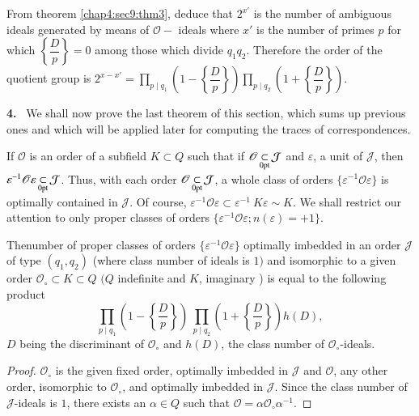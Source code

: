  From theorem \ref{chap4:sec9:thm3}, deduce that $ 2^{x'} $ is the number of ambiguous
 ideals generated by means of  $ \mathscr{O} -$ ideals where $ x' $ is
 the number of primes  $p$ for which $ \left\{ \dfrac{D}{p} \right\}
 = 0 $  among those which divide $ q_1 q_2 $. Therefore the order of
 the quotient group is  $ 2^{x-x'} = \prod \limits_{p \mid q_1}  \left( 1-
 \left\{ \dfrac{D}{p} \right\} \right)  \prod \limits_{p \mid q_2}  \left( 1
 + \left\{ \dfrac{D}{p} \right\} \right) $.  
 
\textbf{4.}~  We shall now prove the last theorem of this section, which sums
  up previous ones and which will be applied later for computing the
  traces of correspondences.  

If $ \mathscr{O} $ is an order of a subfield  $ K \subset Q $ such
that if $ \mathscr{O}  \subs\limits_{\0pt} \mathcal{J} $ and $
\varepsilon $, a unit of $ \mathcal{J} $, then $ \varepsilon^{-1}
\mathscr{O}  \varepsilon  \subs\limits_{\0pt} \mathcal{J} $. Thus,
with each order  $ \mathscr{O}  \subs\limits_{\0pt} \mathcal{J} $, a
whole class of orders  $ \big \{ \varepsilon^{-1} \mathscr{O}
\varepsilon \big \} $ is optimally contained  in  $ \mathcal{J} $. Of
course,  $\varepsilon^{-1} \mathscr{O} \varepsilon \subset
\varepsilon^{-1} ~ K \varepsilon \sim K $. We shall restrict our
attention to only proper classes of orders $ \big \{ \varepsilon^{-1}
\mathscr{O} \varepsilon ; n ( \varepsilon ) = + 1 \big \} $. 

\begin{theorem}\label{chap4:sec9:thm6}%
  The\pageoriginale number of proper classes of orders $ \big \{ \varepsilon^{-1}
  \mathscr{O} \varepsilon \big \} $ optimally imbedded in an order $
  \mathcal{J} $ of type  $ ( q_1,  q_2 ) $ (where class number of
  ideals is  $1 ) $  and  isomorphic to a given order $
  \mathscr{O}_\circ \subset K \subset Q $ $ ( Q $ indefinite  and $K$,
  imaginary )  is equal to the  following product   
  $$
  \prod_{p \mid q_1}  \left( 1 - \left\{ \frac{D}{p} \right\} \right) ~ \prod_{p
    \mid q_2}  \left( 1 + \left\{ \frac{D}{p} \right\} \right) h (D),  
  $$
  $D$  being the discriminant of $ \mathscr{O}_\circ  $ and $ h (D)
  $, the class number of  $ \mathscr{O}_\circ$-ideals. 
\end{theorem}

\begin{proof}
  $ \mathscr{O}_\circ $ is the given fixed order, optimally imbedded
  in $ \mathcal{J} $ and  $ \mathscr{O} $, any other order, isomorphic
  to   $ \mathscr{O}_\circ $, and optimally imbedded in $ \mathcal{J}
  $. Since the class number of $ \mathcal{J} $-ideals is $1$, there
  exists an $ \alpha \in Q $ such that  $ \mathscr{O} = \alpha
  \mathscr{O}_\circ \alpha^{-1} $. 
\end{proof}

